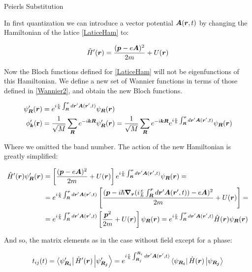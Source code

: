 \begin{subappendices}
\begin{section}{Peierls Substitution}
\label{AP3A}

In first quantization we can introduce a vector potential $\boldsymbol{A}(\boldsymbol{r},t)$ by changing the Hamiltonian of the latice \ref{LaticeHam} to:

\begin{equation}
\label{HamEMF}
  \hat{H}'(\boldsymbol{r}) = \frac{(\boldsymbol{p}-e\boldsymbol{A})^2}{2m} +U(\boldsymbol{r})
\end{equation}

Now the Bloch functions defined for \ref{LaticeHam} will not be eigenfunctions of this Hamiltonian. We define a new set of Wannier functions in terms of those defined in \ref{Wannier2}, and obtain the new Bloch functions. 

\begin{align}
\psi'_{\boldsymbol{R}}(\boldsymbol{r}) &= e^{i\frac{e}{\hbar}\int_{\boldsymbol{R}}^{\boldsymbol{r}} d\boldsymbol{r}'\boldsymbol{A}(\boldsymbol{r}',t)} \psi_{\boldsymbol{R}}(\boldsymbol{r}) \\
\phi'_{\boldsymbol{k}}(\textbf{r}) &= \frac{1}{\sqrt{M}}\sum_{\boldsymbol{R}} e^{-i\boldsymbol{k}\boldsymbol{R}}\psi'_{\boldsymbol{R}}(\boldsymbol{r}) = \frac{1}{\sqrt{M}}\sum_{\boldsymbol{R}} e^{-i\boldsymbol{k}\boldsymbol{R}} e^{i\frac{e}{\hbar}\int_{\boldsymbol{R}}^{\boldsymbol{r}} d\boldsymbol{r}'\boldsymbol{A}(\boldsymbol{r}',t)} \psi_{\boldsymbol{R}}(\boldsymbol{r})
\end{align}

Where we omitted the band number. The action of the new Hamiltonian is greatly simplified:

\begin{align*}
\hat{H}'(\boldsymbol{r}) \psi'_{\boldsymbol{R}} (\boldsymbol{r}) &= \left[ \frac{(\boldsymbol{p}-e\boldsymbol{A})^2}{2m} +U(\boldsymbol{r}) \right] e^{i\frac{e}{\hbar}\int_{\boldsymbol{R}}^{\boldsymbol{r}} d\boldsymbol{r}'\boldsymbol{A}(\boldsymbol{r}',t)} \psi_{\boldsymbol{R}}(\boldsymbol{r}) = \\
&=e^{i\frac{e}{\hbar}\int_{\boldsymbol{R}}^{\boldsymbol{r}} d\boldsymbol{r}'\boldsymbol{A}(\boldsymbol{r}',t)} \left[ \frac{(\boldsymbol{p} - i\hbar \boldsymbol{\nabla_r}(i\frac{e}{\hbar}\int_{\boldsymbol{R}}^{\boldsymbol{r}} d\boldsymbol{r}'\boldsymbol{A}(\boldsymbol{r}',t)) -e\boldsymbol{A})^2}{2m} +U(\boldsymbol{r}) \right] = \\
&= e^{i\frac{e}{\hbar}\int_{\boldsymbol{R}}^{\boldsymbol{r}} d\boldsymbol{r}'\boldsymbol{A}(\boldsymbol{r}',t)} \left[ \frac{\boldsymbol{p}^2}{2m} + U(\boldsymbol{r}) \right] \psi_{\boldsymbol{R}}(\boldsymbol{r}) = e^{i\frac{e}{\hbar}\int_{\boldsymbol{R}}^{\boldsymbol{r}} d\boldsymbol{r}'\boldsymbol{A}(\boldsymbol{r}',t)} \hat{H}(\boldsymbol{r}) \psi_{\boldsymbol{R}}(\boldsymbol{r})
\end{align*}

And so, the matrix elements as in the case without field except for a phase:

\begin{equation}
\label{PeierlsMtxElem}
t_{ij}(t) = \bra{\psi'_{\boldsymbol{R_i}}} \hat{H}'(\boldsymbol{r}) \ket{\psi'_{\boldsymbol{R_j}}} = e^{i\frac{e}{\hbar}\int_{\boldsymbol{R}_j}^{\boldsymbol{R}_i} d\boldsymbol{r}'\boldsymbol{A}(\boldsymbol{r}',t)} \bra{\psi_{\boldsymbol{R_i}}} \hat{H}(\boldsymbol{r}) \ket{\psi_{\boldsymbol{R_j}}}
\end{equation}


\end{section}
\end{subappendices}
